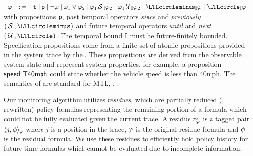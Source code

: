 \(
\begin{array}{ccc}
\policy & ::=  & \true \mid \pred{p} \mid \neg \policy \mid \policy_1\vee \policy_2\mid
\policy_1\since_{\interval}\policy_2 \mid \policy_1\until_{\interval}\policy_2\mid\yesterday_{\interval}\policy\mid \tomorrow_{\interval}\policy
\end{array}
\) \\
with propositions $\mathsf{p}$, past temporal operators \emph{since} and \emph{previously} $(\since, \yesterday)$ and future temporal operators \emph{until} and \emph{next} $(\until, \tomorrow)$. The temporal bound $\mathbb{I}$ must be future-finitely bounded.
Specification propositions come from a finite set of atomic propositions provided in the system trace by the \sfmap. 
These propositions are derived from the observable system state and represent system properties, for example, a proposition $\mathsf{speedLT40mph}$ could state whether the vehicle speed is less than 40mph.
%
The semantics of \planguage are standard for MTL, \eg, \cite{Basin2008}.


Our monitoring algorithm utilizes \emph{residues}, which are partially reduced (\ie, rewritten) policy formulas representing the remaining portion of a formula which could not be fully evaluated given the current trace. A residue $r^j_{\varphi}$ is a tagged pair $\langle j, \phi \rangle_{\varphi}$ where $j$ is a position in the trace, $\varphi$ is the original residue formula and $\phi$ is the residual formula. We use these residues to efficiently hold policy history for future time formulas which cannot be evaluated due to incomplete information. 

